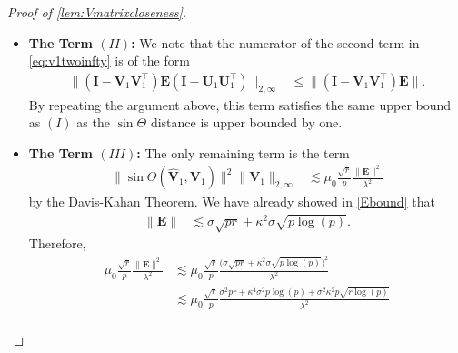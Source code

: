 \documentclass[10pt]{article}
\newcommand{\0}{{\mathbf{0}}}
\newcommand{\1}{{\mathbf{1}}}
\newcommand{\U}{{\mathbf{U}}}
\renewcommand{\t}{^{\top}}
\renewcommand{\hat}{\widehat}
\renewcommand{\hat}{\widehat}
\begin{document}
\begin{proof}[Proof of \cref{lem:Vmatrixcloseness}]
\begin{itemize}
Therefore, with probability at least $1 - O(p^{-9})$,
\begin{align}
    &\frac{ \| ( \mathbf{I} - \mathbf{V}_1 \mathbf{V}_1\t ) \mathbf{E} \U_1 \U_1\t \|_{2,\infty} }{\lambda} \nonumber \\
    &\lesssim  \frac{1}{\lambda} \bigg\{ \lambda_1 \frac{ \sigma \mu_0^2 r \sqrt{\log(p)}}{\lambda \sqrt{p}} + \lambda_1 \mu_0 \frac{\sqrt{r}}{p} \frac{\kappa \sigma \sqrt{p\log(p)}}{\lambda}  + \mu_0^2 \frac{r}{p} \sigma \sqrt{pr} \bigg\}\nonumber \\
     &\lesssim \frac{\kappa \sigma \mu_0^2 r \sqrt{\log(p)}  + \kappa^2 \sigma \mu_0 \sqrt{r\log(p)} + \sigma \mu_0^2 r^{3/2}}{\lambda\sqrt{p}  } \nonumber \\
     &\lesssim \frac{\kappa^2 \sigma \mu_0^2 r^{3/2} \sqrt{\log(p)}}{\lambda \sqrt{p}}\label{v1bd1}
     \end{align}
\item  \textbf{The Term $(II)$:} We note that the numerator of the second term in \eqref{eq:v1twoinfty} is of the form
\begin{align*}
    \| ( \mathbf{I} - \mathbf{V}_1 \mathbf{V}_1\t ) \mathbf{E}( \mathbf{I} - \U_1 \U_1\t) \|_{2,\infty} &\leq   \| ( \mathbf{I} - \mathbf{V}_1 \mathbf{V}_1\t ) \mathbf{E} \|.
\end{align*}
By repeating the argument above, this term satisfies the same upper bound as $(I)$ as the  $\sin\Theta$ distance is upper bounded by one. 
\item \textbf{The Term $(III)$:} The only remaining term is the term
\begin{align*}
    \| \sin\Theta( \mathbf{\hat V}_1 , \mathbf{V}_1 ) \|^2 \|\mathbf{V}_1 \|_{2,\infty} &\lesssim \mu_0 \frac{\sqrt{r}}{p} \frac{ \| \mathbf{E} \|^2}{\lambda^2}
\end{align*}
by the Davis-Kahan Theorem.  We have already showed in \eqref{Ebound} that
\begin{align*}
    \| \mathbf{E} \| &\lesssim \sigma \sqrt{pr} +  \kappa^2 \sigma \sqrt{p\log(p)}.
\end{align*}
Therefore,
\begin{align*}
   \mu_0 \frac{\sqrt{r}}{p} \frac{ \| \mathbf{E} \|^2}{\lambda^2} &\lesssim \mu_0 \frac{\sqrt{r}}{p}  \frac{ \big( \sigma \sqrt{pr} +  \kappa^2 \sigma \sqrt{p\log(p)} \big)^2}{\lambda^2} \\
    &\lesssim \mu_0 \frac{\sqrt{r}}{p}  \frac{\sigma^2 pr + \kappa^4 \sigma^2 p\log(p) + \sigma^2 \kappa^2 p \sqrt{r\log(p)}}{\lambda^2} \\

\end{align*}
\end{itemize}
\end{proof}
\end{document}
